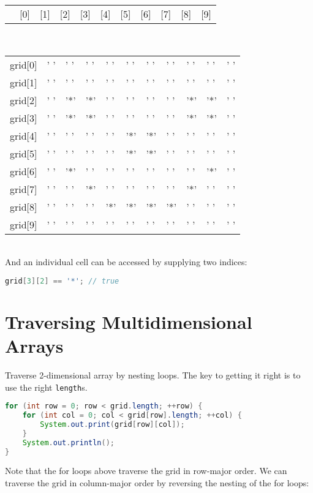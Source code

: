\documentclass{article}
\begin{document}
\begin{tabular}{p{.4in}p{.2in}p{.2in}p{.2in}p{.2in}p{.2in}p{.2in}p{.2in}p{.2in}p{.2in}p{.2in}}
         & [0] & [1] & [2] & [3] & [4] & [5] & [6] & [7] & [8] & [9]
\end{tabular}\\
\begin{tabular}{p{.4in}|p{.2in}|p{.2in}|p{.2in}|p{.2in}|p{.2in}|p{.2in}|p{.2in}|p{.2in}|p{.2in}|p{.2in}|}\cline{2-11}
grid[0] & ' ' & ' ' & ' ' & ' ' & ' ' & ' ' & ' ' & ' ' & ' ' & ' ' \\
\cline{2-11}
grid[1] & ' ' & ' ' & ' ' & ' ' & ' ' & ' ' & ' ' & ' ' & ' ' & ' ' \\
\cline{2-11}
grid[2] & ' ' & '*' & '*' & ' ' & ' ' & ' ' & ' ' & '*' & '*' & ' ' \\
\cline{2-11}
grid[3] & ' ' & '*' & \cellcolor{yellow}'*' & ' ' & ' ' & ' ' & ' ' & '*' & '*' & ' ' \\
\cline{2-11}
grid[4] & ' ' & ' ' & ' ' & ' ' & '*' & '*' & ' ' & ' ' & ' ' & ' ' \\
\cline{2-11}
grid[5] & ' ' & ' ' & ' ' & ' ' & '*' & '*' & ' ' & ' ' & ' ' & ' ' \\
\cline{2-11}
grid[6] & ' ' & '*' & ' ' & ' ' & ' ' & ' ' & ' ' & ' ' & '*' & ' ' \\
\cline{2-11}
grid[7] & ' ' & ' ' & '*' & ' ' & ' ' & ' ' & ' ' & '*' & ' ' & ' ' \\
\cline{2-11}
grid[8] & ' ' & ' ' & ' ' & '*' & '*' & '*' & '*' & ' ' & ' ' & ' ' \\
\cline{2-11}
grid[9] & ' ' & ' ' & ' ' & ' ' & ' ' & ' ' & ' ' & ' ' & ' ' & ' ' \\
\cline{2-11}
\end{tabular}\\

And an individual cell can be accessed by supplying two indices:

\begin{lstlisting}[language=Java]
grid[3][2] == '*'; // true
\end{lstlisting}


\section{Traversing Multidimensional Arrays}


Traverse 2-dimensional array by nesting loops.  The key to getting it right is to use the right {\tt length}s.

\begin{lstlisting}[language=Java]
for (int row = 0; row < grid.length; ++row) {
    for (int col = 0; col < grid[row].length; ++col) {
        System.out.print(grid[row][col]);
    }
    System.out.println();
}
\end{lstlisting}
Note that the for loops above traverse the grid in row-major order.  We can traverse the grid in column-major order by reversing the nesting of the for loops:
\end{document}
